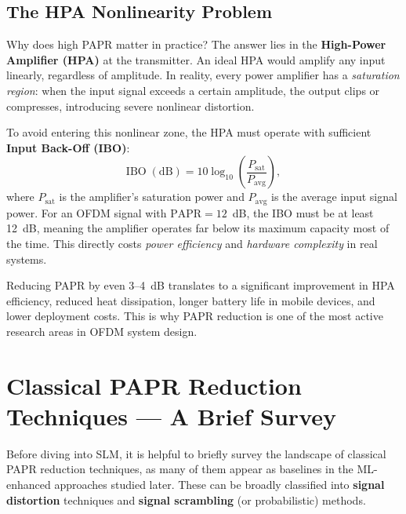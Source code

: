 \subsection{The HPA Nonlinearity Problem}

Why does high PAPR matter in practice?  The answer lies in the
\textbf{High-Power Amplifier (HPA)} at the transmitter.
An ideal HPA would amplify any input linearly, regardless of amplitude.
In reality, every power amplifier has a \emph{saturation region}:
when the input signal exceeds a certain amplitude, the output clips
or compresses, introducing severe nonlinear distortion.

To avoid entering this nonlinear zone, the HPA must operate with sufficient
\textbf{Input Back-Off (IBO)}:
\begin{equation*}
    \mathrm{IBO\;(dB)} = 10\log_{10}\!\left(\frac{P_{\mathrm{sat}}}{P_{\mathrm{avg}}}\right),
\end{equation*}
where $P_{\mathrm{sat}}$ is the amplifier's saturation power and
$P_{\mathrm{avg}}$ is the average input signal power.  For an OFDM signal
with $\mathrm{PAPR} = 12$~dB, the IBO must be at least 12~dB, meaning
the amplifier operates far below its maximum capacity most of the time.
This directly costs \emph{power efficiency} and \emph{hardware complexity}
in real systems.

\begin{keyinsight}
    Reducing PAPR by even 3--4~dB translates to a significant improvement
    in HPA efficiency, reduced heat dissipation, longer battery life in
    mobile devices, and lower deployment costs.  This is why PAPR reduction
    is one of the most active research areas in OFDM system
    design.
\end{keyinsight}


\section{Classical PAPR Reduction Techniques --- A Brief Survey}

Before diving into SLM, it is helpful to briefly survey the landscape of
classical PAPR reduction techniques, as many of them appear as baselines
in the ML-enhanced approaches studied later.  These can be broadly
classified into \textbf{signal distortion} techniques and
\textbf{signal scrambling} (or probabilistic) methods.

